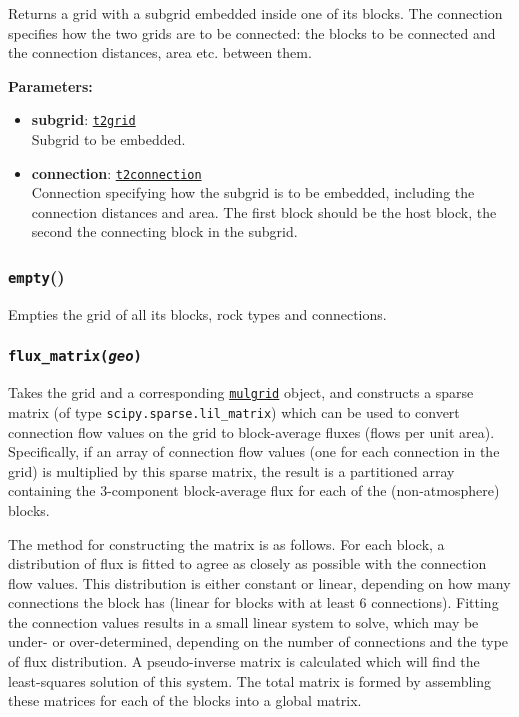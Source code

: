 Returns a grid with a subgrid embedded inside one of its blocks.  The connection specifies how the two grids are to be connected: the blocks to be connected and the connection distances, area etc. between them.

\textbf{Parameters:}
\begin{itemize}
\item \textbf{subgrid}: \hyperref[t2grids]{\texttt{t2grid}}\\
  Subgrid to be embedded.
\item \textbf{connection}: \hyperref[t2connectionobjects]{\texttt{t2connection}}\\
  Connection specifying how the subgrid is to be embedded, including the connection distances and area.  The first block should be the host block, the second the connecting block in the subgrid.
\end{itemize}

\begin{snugshade}
\subsubsection{\texttt{empty}()}
\end{snugshade}
\label{sec:t2grid:empty}

Empties the grid of all its blocks, rock types and connections.

\begin{snugshade}
\subsubsection{\texttt{flux\_matrix(\emph{geo})}}
\end{snugshade}
\label{sec:t2grid:flux_matrix}

Takes the grid and a corresponding \hyperref[mulgrids]{\texttt{mulgrid}} object, and constructs a sparse matrix (of type \texttt{scipy.sparse.lil\_matrix}) which can be used to convert connection flow values on the grid to block-average fluxes (flows per unit area).  Specifically, if an array of connection flow values (one for each connection in the grid) is multiplied by this sparse matrix, the result is a partitioned array containing the 3-component block-average flux for each of the (non-atmosphere) blocks.

The method for constructing the matrix is as follows.  For each block, a distribution of flux is fitted to agree as closely as possible with the connection flow values.  This distribution is either constant or linear, depending on how many connections the block has (linear for blocks with at least 6 connections).  Fitting the connection values results in a small linear system to solve, which may be under- or over-determined, depending on the number of connections and the type of flux distribution.  A pseudo-inverse matrix is calculated which will find the least-squares solution of this system.  The total matrix is formed by assembling these matrices for each of the blocks into a global matrix.


